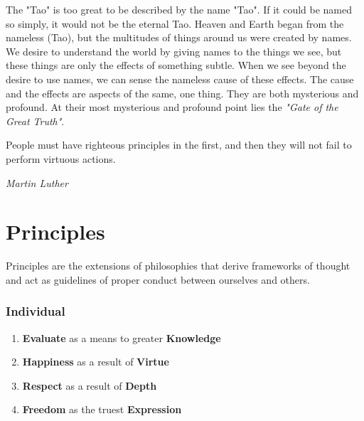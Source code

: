 \documentclass[11pt]{article}
\begin{document}
\noindent
\vspace{-10pt}
\begin{flushright}
The "Tao" is too great to be described by the name "Tao".
If it could be named so simply, it would not be the eternal Tao.\vspace{10pt}\linebreak
Heaven and Earth began from the nameless (Tao),
but the multitudes of things around us were created by names.\vspace{10pt}\linebreak
We desire to understand the world by giving names to the things we see, but these things are only the effects of something subtle.\vspace{10pt}\linebreak
When we see beyond the desire to use names, we can sense the nameless cause of these effects. \vspace{10pt}\linebreak
The cause and the effects are aspects of the same, one thing.
They are both mysterious and profound.\vspace{20pt}\linebreak
At their most mysterious and profound point lies the \textit{"Gate of the Great Truth"}.
\end{flushright}

\epigraph{People must have righteous principles in the first, and then they will not fail to perform virtuous actions.}{\textit{\footnotesize{Martin Luther}}}

\section{Principles}

Principles are the extensions of philosophies that derive frameworks of thought and act as guidelines of proper conduct between ourselves and others.

\subsubsection{Individual}

\begin{enumerate}
\item \textbf{Evaluate} as a means to greater \textbf{Knowledge}
\item \textbf{Happiness} as a result of \textbf{Virtue}
\item \textbf{Respect} as a result of \textbf{Depth}
\item \textbf{Freedom} as the truest \textbf{Expression}
\end{enumerate}
\end{document}
